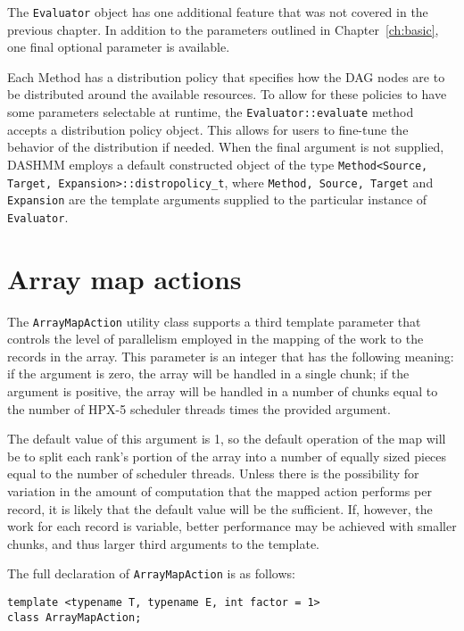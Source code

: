 The \texttt{Evaluator} object has one additional feature that was not
covered in the previous chapter. In addition to the parameters outlined
in Chapter~\ref{ch:basic}, one final optional parameter is available.

Each Method has a distribution policy that specifies how the DAG nodes are
to be distributed around the available resources. To allow for these policies
to have some parameters selectable at runtime, the
\texttt{Evaluator::evaluate} method accepts a distribution policy object.
This allows for users to fine-tune the behavior of the distribution if needed.
When the final argument is not supplied, DASHMM employs a default constructed
object of the type \texttt{Method<Source, Target, Expansion>::distropolicy\_t},
where \texttt{Method, Source, Target} and \texttt{Expansion} are the template
arguments supplied to the particular instance of \texttt{Evaluator}.



\section{Array map actions}

The \texttt{ArrayMapAction} utility class supports a third template parameter
that controls the level of parallelism employed in the mapping of the work
to the records in the array. This parameter is an integer that has the
following meaning: if the argument is zero, the array will be handled in a
single chunk; if the argument is positive, the array will be handled in a number
of chunks equal to the number of HPX-5 scheduler threads times the provided
argument.

The default value of this argument is 1, so the default operation of
the map will be to split each rank's portion of the array into a number of
equally sized pieces equal to the number of scheduler threads. Unless there is
the possibility for variation in the amount of computation that the mapped
action performs per record, it is likely that the default value will be
the sufficient. If, however, the work for each record is variable, better
performance may be achieved with smaller chunks, and thus larger third arguments
to the template.

The full declaration of \texttt{ArrayMapAction} is as follows:

\begin{verbatim}
template <typename T, typename E, int factor = 1>
class ArrayMapAction;
\end{verbatim}




